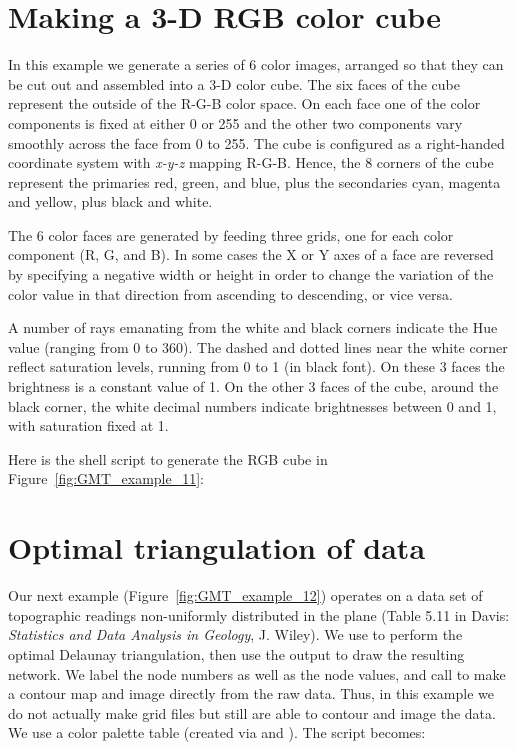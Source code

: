 

\section{Making a 3-D RGB color cube}

In this example we generate a series of 6 color images,
arranged so that they can be cut out
and assembled into a 3-D color cube.  The six faces of
the cube represent the outside of the R-G-B color space.
On each face one of the color components is fixed at either
0 or 255 and the other two components vary smoothly across
the face from 0 to 255.  The cube is configured as a
right-handed coordinate system with \emph{x-y-z} mapping
R-G-B.  Hence, the 8 corners of the cube represent the
primaries red, green, and blue, plus the secondaries cyan,
magenta and yellow, plus black and white.

The 6 color faces are generated by feeding  three grids, one for each color
component (R, G, and B). In some cases the X or Y axes of a face are reversed by specifying a
negative width or height in order to change the variation of the color value in that direction from
ascending to descending, or vice versa.

A number of rays emanating from the white and black corners indicate the Hue value (ranging from 0 to
360\DS). The dashed and dotted lines near the white corner reflect saturation levels, running from 0
to 1 (in black font). On these 3 faces the brightness is a constant value of 1.
On the other 3 faces of the cube, around the black corner, the white decimal numbers indicate
brightnesses between 0 and 1, with saturation fixed at 1.

Here is the shell script to generate the RGB cube in Figure~\ref{fig:GMT_example_11}:



\section{Optimal triangulation of data}
\label{sec:example_12}

Our next example (Figure~\ref{fig:GMT_example_12})
operates on a data set of topographic
readings non-uniformly distributed in the plane (Table
5.11 in Davis: \emph{Statistics and Data Analysis in Geology},
J. Wiley).  We use  to perform the optimal
Delaunay triangulation, then use the output to draw the
resulting network.  We label the node numbers as well as
the node values, and call  to make a contour
map and image directly from the raw data.  Thus, in this
example we do not actually make grid files but still
are able to contour and image the data.  We use a color
palette table  (created via  and ).
The script becomes:

